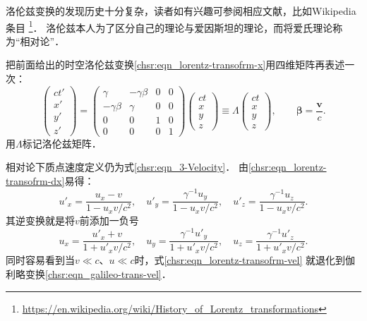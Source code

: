 洛伦兹变换的发现历史十分复杂，读者如有兴趣可参阅相应文献，比如Wikipedia条目
{\footnote{\url{https://en.wikipedia.org/wiki/History\_of\_Lorentz\_transformations}}}．
洛伦兹本人为了区分自己的理论与爱因斯坦的理论，而将爱氏理论称为“相对论”．




把前面给出的时空洛伦兹变换\eqref{chsr:eqn_lorentz-transofrm-x}用四维矩阵再表述一次：
\begin{equation}\label{chsr:eqn_lorentz-transofrm-x-MatrixForm}
\begin{pmatrix}
ct'\\x'\\y'\\z'
\end{pmatrix} =
\begin{pmatrix}
\gamma & -\gamma \beta  & 0 & 0 \\
-\gamma \beta & \gamma  & 0 & 0 \\
0 & 0 & 1 & 0 \\
0 & 0 & 0 & 1
\end{pmatrix}
\begin{pmatrix}
ct\\x\\y\\z
\end{pmatrix} \equiv \Lambda
\begin{pmatrix}
ct\\x\\y\\z
\end{pmatrix}, \qquad \boldsymbol{\beta}=\frac{\boldsymbol{v}}{c}.
\end{equation}
用$\Lambda$标记洛伦兹矩阵．




相对论下质点速度定义仍为式\eqref{chsr:eqn_3-Velocity}．
由\eqref{chsr:eqn_lorentz-transofrm-dx}易得：
\begin{equation}\label{chsr:eqn_lorentz-transofrm-vel}
    u'_x = \dfrac{u_x -v}{1-u_x v/c^2}, \quad
    u'_y = \dfrac{\gamma^{-1}u_y}{1-u_x v/c^2}, \quad
    u'_z = \dfrac{\gamma^{-1}u_z}{1-u_x v/c^2}.
\end{equation}
其逆变换就是将$v$前添加一负号
\begin{equation}\label{chsr:eqn_lorentz-transofrm-vel-inv}
    u_x = \dfrac{u'_x +v}{1+u'_x v/c^2}, \quad
    u_y = \dfrac{\gamma^{-1}u'_y}{1+u'_x v/c^2}, \quad
    u_z = \dfrac{\gamma^{-1}u'_z}{1+u'_x v/c^2}.
\end{equation}
同时容易看到当$v \ll c$、$u \ll c$时，式\eqref{chsr:eqn_lorentz-transofrm-vel}
就退化到伽利略变换\eqref{chsr:eqn_galileo-trans-vel}．

